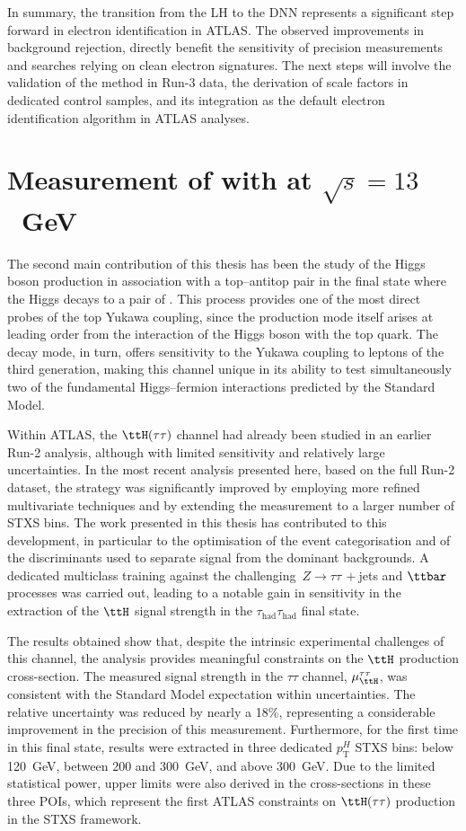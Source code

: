In summary, the transition from the LH to the DNN represents a significant step forward in electron identification in ATLAS. The observed improvements in background rejection, directly benefit the sensitivity of precision measurements and searches relying on clean electron signatures. The next steps will involve the validation of the method in Run-3 data, the derivation of scale factors in dedicated control samples, and its integration as the default electron identification algorithm in ATLAS analyses.

\section{Measurement of \ttH with \htautau at $\sqrt{s}=13$~GeV}

The second main contribution of this thesis has been the study of the Higgs boson production in association with a top–antitop pair in the final state where the Higgs decays to a pair of \taul. This process provides one of the most direct probes of the top Yukawa coupling, since the production mode itself arises at leading order from the interaction of the Higgs boson with the top quark. The \htautau decay mode, in turn, offers sensitivity to the Yukawa coupling to leptons of the third generation, making this channel unique in its ability to test simultaneously two of the fundamental Higgs–fermion interactions predicted by the Standard Model.

Within ATLAS, the \(\ttH(\tau\tau)\) channel had already been studied in an earlier Run-2 analysis, although with limited sensitivity and relatively large uncertainties. In the most recent analysis presented here, based on the full Run-2 dataset, the strategy was significantly improved by employing more refined multivariate techniques and by extending the measurement to a larger number of STXS bins. The work presented in this thesis has contributed to this development, in particular to the optimisation of the event categorisation and of the discriminants used to separate signal from the dominant backgrounds. A dedicated multiclass training against the challenging \(\,Z\to\tau\tau\,+\)jets and \(\ttbar\) processes was carried out, leading to a notable gain in sensitivity in the extraction of the \(\ttH\) signal strength in the \(\tau_{\mathrm{had}}\tau_{\mathrm{had}}\) final state.  

The results obtained show that, despite the intrinsic experimental challenges of this channel, the analysis provides meaningful constraints on the \(\ttH\) production cross-section. The measured signal strength in the \(\tau\tau\) channel, \(\mu_{\ttH}^{\tau\tau}\), was consistent with the Standard Model expectation within uncertainties. The relative uncertainty was reduced by nearly a 18\%, representing a considerable improvement in the precision of this measurement. Furthermore, for the first time in this final state, results were extracted in three dedicated \(p_{\mathrm{T}}^{H}\) STXS bins: below 120~GeV, between 200 and 300~GeV, and above 300~GeV. Due to the limited statistical power, upper limits were also derived in the cross-sections in these three POIs, which represent the first ATLAS constraints on \(\ttH(\tau\tau)\) production in the STXS framework.  

